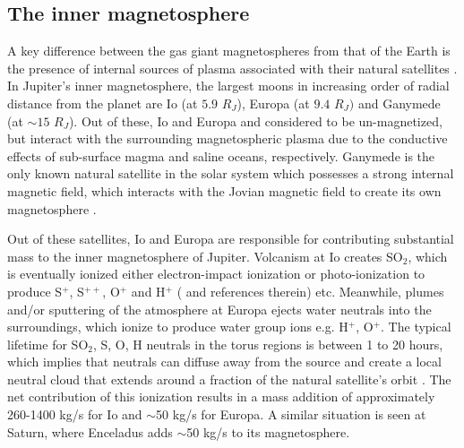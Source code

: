 \subsection{The inner magnetosphere}

A key difference between the gas giant magnetospheres from that of the Earth is the presence of internal sources of plasma associated with their natural satellites \cite{Bolton2015a}. In Jupiter's inner magnetosphere, the largest moons in increasing order of radial distance from the planet are Io (at $5.9$ $R_J$), Europa (at $9.4$ $R_J)$ and Ganymede (at $\sim15$ $R_J$). Out of these, Io and Europa and considered to be un-magnetized, but interact with the surrounding magnetospheric plasma due to the conductive effects of sub-surface magma and saline oceans, respectively. Ganymede is the only known natural satellite in the solar system which possesses a strong internal magnetic field, which interacts with the Jovian magnetic field to create its own magnetosphere \cite{Russell2005InteractionEnvironments,Jia2010MagneticSaturn,Khurana2011EvidenceInterior,Kivelson1996DiscoverySpacecraft,Kivelson2000GalileoEuropa}. 

Out of these satellites, Io and Europa are responsible for contributing substantial mass to the inner magnetosphere of Jupiter. Volcanism at Io creates SO$_2$, which is eventually ionized either electron-impact ionization or photo-ionization to produce S$^{+}$, S$^{++}$, O$^+$ and H$^+$ ( and references therein) etc. Meanwhile, plumes and/or sputtering of the atmosphere at Europa ejects water neutrals into the surroundings, which ionize to produce water group ions e.g. H$^+$, O$^+$. The typical lifetime for SO$_2$, S, O, H neutrals in the torus regions is between 1 to 20 hours, which implies that neutrals can diffuse away from the source and create a local neutral cloud that extends around a fraction of the natural satellite's orbit \cite{Smyth1992NeutralSystem,Smyth2006EuropasImplications}. The net contribution of this ionization results in a mass addition of approximately 260-1400 kg/s for Io \cite{Bagenal2011b} and $\sim$50 kg/s for Europa. A similar situation is seen at Saturn, where Enceladus adds $\sim$50 kg/s to its magnetosphere. 

